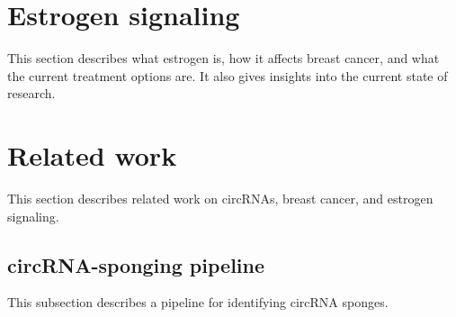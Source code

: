 \section{Estrogen signaling}
This section describes what estrogen is, how it affects breast cancer, and what
the current treatment options are. It also gives insights into the current state
of research.

\lipsum[4]

\section{Related work}
This section describes related work on circRNAs, breast cancer, and estrogen
signaling.

\subsection{circRNA-sponging pipeline}
This subsection describes a pipeline for identifying circRNA sponges.